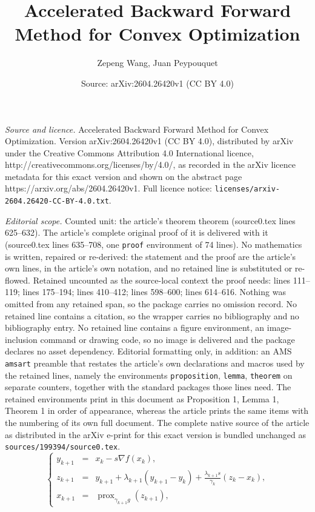 \documentclass[10pt,a4paper]{amsart}
\title{Accelerated Backward Forward Method for Convex Optimization}
\author{Zepeng Wang, Juan Peypouquet}
\date{Source: arXiv:2604.26420v1 (CC BY 4.0)}
\DeclareMathOperator{\prox}{prox}
\begin{document}
\maketitle

\noindent\emph{Source and licence.} Accelerated Backward Forward Method for Convex Optimization. Version arXiv:2604.26420v1 (CC BY 4.0), distributed by arXiv under the Creative Commons Attribution 4.0 International licence, http://creativecommons.org/licenses/by/4.0/, as recorded in the arXiv licence metadata for this exact version and shown on the abstract page https://arxiv.org/abs/2604.26420v1. Full licence notice: \texttt{licenses/arxiv-2604.26420-CC-BY-4.0.txt}.\par\smallskip

\noindent\textit{Editorial scope.} Counted unit: the article's theorem theorem (source0.tex lines 625--632). The article's complete original proof of it is delivered with it (source0.tex lines 635--708, one \texttt{proof} environment of 74 lines). No mathematics is written, repaired or re-derived: the statement and the proof are the article's own lines, in the article's own notation, and no retained line is substituted or re-flowed.  Retained uncounted as the source-local context the proof needs: lines 111--119; lines 175--194; lines 410--412; lines 598--600; lines 614--616.  Nothing was omitted from any retained span, so the package carries no omission record.  No retained line contains a citation, so the wrapper carries no bibliography and no bibliography entry.  No retained line contains a figure environment, an image-inclusion command or drawing code, so no image is delivered and the package declares no asset dependency.  Editorial formatting only, in addition: an AMS \texttt{amsart} preamble that restates the article's own declarations and macros used by the retained lines, namely the environments \texttt{proposition}, \texttt{lemma}, \texttt{theorem} on separate counters, together with the standard packages those lines need.  The retained environments print in this document as Proposition 1, Lemma 1, Theorem 1 in order of appearance, whereas the article prints the same items with the numbering of its own full document.  The complete native source of the article as distributed in the arXiv e-print for this exact version is bundled unchanged as \texttt{sources/199394/source0.tex}.
\begin{equation}\label{Algo: APM}\tag{ABF}
\left\{
\begin{array}{rcl}
y_{k+1} &=& x_k - s \nabla f(x_k), \\[3pt]
z_{k+1} &=& y_{k+1} + \lambda_{k+1} ( y_{k+1} - y_k ) + \frac{\lambda_{k+1}s}{\gamma_k}( z_k - x_k ),\\[3pt]
x_{k+1} &=& \prox_{ \gamma_{k+1} g }(z_{k+1}),
\end{array} 
\right.
\end{equation}
\end{document}
